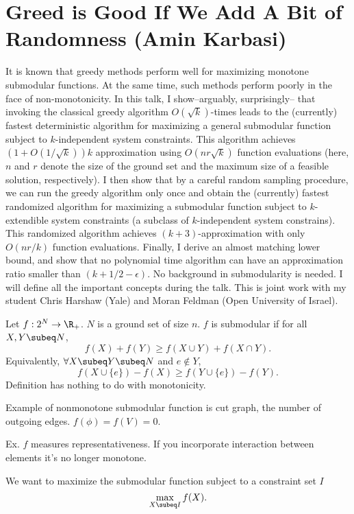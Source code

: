 \section{Greed is Good If We Add A Bit of Randomness
(Amin Karbasi)}
It is known that greedy methods perform well for maximizing monotone
submodular functions. At the same time, such methods perform poorly in
the face of non-monotonicity. In this talk, I show--arguably,
surprisingly-- that invoking the classical greedy algorithm
$O(\sqrt{k})$-times leads to the (currently) fastest deterministic
algorithm for maximizing a general submodular function subject to
$k$-independent system constraints. This algorithm achieves $(1 +
O(1/\sqrt{k}))k$ approximation using $O(nr\sqrt{k})$ function evaluations
(here, $n$ and $r$ denote the size of the ground set and the maximum size
of a feasible solution, respectively). I then show that by a careful
random sampling procedure, we can run the greedy algorithm only once
and obtain the (currently) fastest randomized algorithm for maximizing
a submodular function subject to $k$-extendible system constraints (a
subclass of $k$-independent system constrains). This randomized
algorithm achieves $(k + 3)$-approximation with only $O(nr/k)$ function
evaluations. Finally, I derive an almost matching lower bound, and
show that no polynomial time algorithm can have an approximation ratio
smaller than  $(k + 1/2 - \epsilon)$. No background in submodularity is
needed. I will define all the important concepts during the talk. This
is joint work with my student Chris Harshaw (Yale) and Moran Feldman
(Open University of Israel).

Let $f:2^N\to \R_+$. $N$ is a ground set of size $n$. $f$ is submodular if for all $X,Y\subeq N$,
$$
f(X) + f(Y) \ge f(X\cup Y) + f(X\cap Y).
$$
Equivalently, $\forall X\subeq Y\subeq N$ and $e\nin Y$,
$$
f(X\cup \{e\}) - f(X) \ge f(Y\cup \{e\}) - f(Y).
$$
Definition has nothing to do with monotonicity.

Example of nonmonotone submodular function is cut graph, the number of outgoing edges. $f(\phi)=f(V)=0$.

Ex. $f$ measures representativeness. If you incorporate interaction between elements it's no longer monotone.

We want to maximize the submodular function subject to a constraint set $I$
$$
\max_{X\subeq I} f(X).
$$


